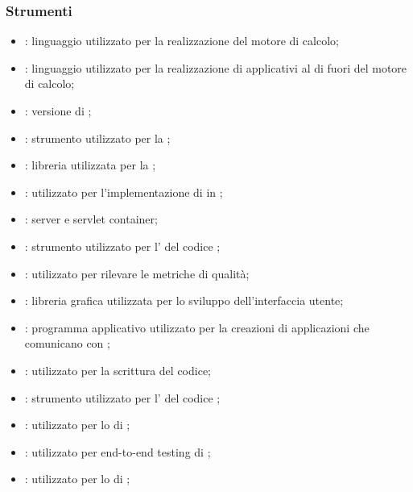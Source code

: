     \subsubsection{Strumenti}
    \begin{itemize}
        \item \textbf{}: linguaggio utilizzato per la realizzazione del motore di calcolo;
        \item \textbf{}: linguaggio utilizzato per la realizzazione di applicativi al di fuori del motore di calcolo;
        \item \textbf{}: versione  di ;
        \item \textbf{}: strumento utilizzato per la ;
        \item \textbf{}: libreria utilizzata per la ;
        \item \textbf{}:  utilizzato per l'implementazione di  in ;
        \item \textbf{}: server  e servlet container;
        \item \textbf{}: strumento utilizzato per l' del codice ;
        \item \textbf{}: utilizzato per rilevare le metriche di qualità;
        \item \textbf{}: libreria grafica utilizzata per lo sviluppo dell'interfaccia utente;
        \item \textbf{}: programma applicativo utilizzato per la creazioni di applicazioni che comunicano con ;
        \item \textbf{}:  utilizzato per la scrittura del codice;
        \item \textbf{}: strumento utilizzato per l' del codice ;
        \item \textbf{}:  utilizzato per lo  di ;
        \item \textbf{}:  utilizzato per end-to-end testing di ;
        \item \textbf{}:  utilizzato per lo  di ;

\end{itemize}

